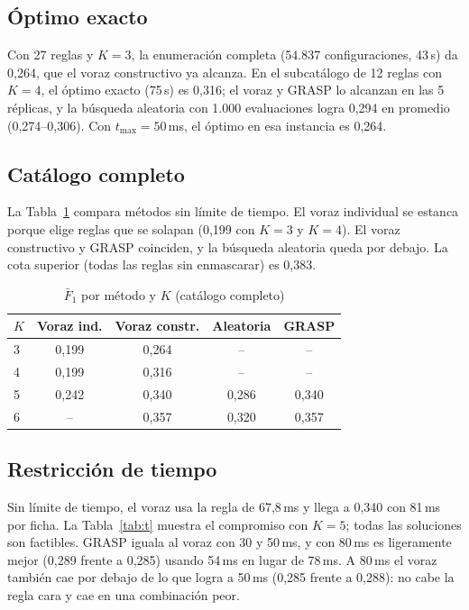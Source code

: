 \documentclass[conference]{IEEEtran}
\begin{document}
	\subsection{\'Optimo exacto}
	Con 27 reglas y $K=3$, la enumeraci\'on completa (54.837 configuraciones, 43\,s) da 0,264, que el voraz constructivo ya alcanza. En el subcat\'alogo de 12 reglas con $K=4$, el \'optimo exacto (75\,s) es 0,316; el voraz y GRASP lo alcanzan en las 5 r\'eplicas, y la b\'usqueda aleatoria con 1.000 evaluaciones logra 0,294 en promedio (0,274--0,306). Con $t_{\max}=50$\,ms, el \'optimo en esa instancia es 0,264.
	
	\subsection{Cat\'alogo completo}
	La Tabla~\ref{tab:k} compara m\'etodos sin l\'imite de tiempo. El voraz individual se estanca porque elige reglas que se solapan (0,199 con $K=3$ y $K=4$). El voraz constructivo y GRASP coinciden, y la b\'usqueda aleatoria queda por debajo. La cota superior (todas las reglas sin enmascarar) es 0,383.
	
	\begin{table}[t]
		\centering
		\caption{$\bar F_1$ por m\'etodo y $K$ (cat\'alogo completo)}
		\label{tab:k}
		\footnotesize
		\begin{tabular}{lcccc}
			\toprule
			$K$ & Voraz ind. & Voraz constr. & Aleatoria & GRASP \\
			\midrule
			3 & 0,199 & 0,264 & -- & -- \\
			4 & 0,199 & 0,316 & -- & -- \\
			5 & 0,242 & 0,340 & 0,286 & 0,340 \\
			6 & -- & 0,357 & 0,320 & 0,357 \\
			\bottomrule
		\end{tabular}
	\end{table}
	
	\subsection{Restricci\'on de tiempo}
	Sin l\'imite de tiempo, el voraz usa la regla de 67,8\,ms y llega a 0,340 con 81\,ms por ficha. La Tabla~\ref{tab:t} muestra el compromiso con $K=5$; todas las soluciones son factibles. GRASP iguala al voraz con 30 y 50\,ms, y con 80\,ms es ligeramente mejor (0,289 frente a 0,285) usando 54\,ms en lugar de 78\,ms. A 80\,ms el voraz tambi\'en cae por debajo de lo que logra a 50\,ms (0,285 frente a 0,288): no cabe la regla cara y cae en una combinaci\'on peor.
	
\end{document}
